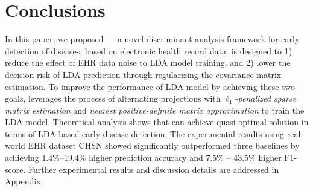 \begin{itemize}

\end{itemize}

\section{Conclusions}\label{sec:7}
In this paper, we proposed \TheName{} --- a novel discriminant analysis framework for early detection of diseases, based on electronic health record data. 
\TheName{} is designed to 1) reduce the effect of EHR data noise to LDA model training, and 2) lower the decision risk of LDA prediction through regularizing the covariance matrix estimation. 
To improve the performance of LDA model by achieving these two goals, \TheName{} leverages the process of alternating projections with \emph{$\ell_1$-penalized sparse matrix estimation} and \emph{nearest positive-definite matrix approximation} to train the LDA model. 
Theoretical analysis shows that \TheName{} can achieve quasi-optimal solution in terms of LDA-based early disease detection. 
The experimental results using real-world EHR dataset CHSN showed \TheName{} significantly outperformed three baselines by achieving 1.4\%--19.4\%  higher prediction accuracy and 7.5\% -- 43.5\% higher F1-score. 
Further experimental results and discussion details are addressed in Appendix.


